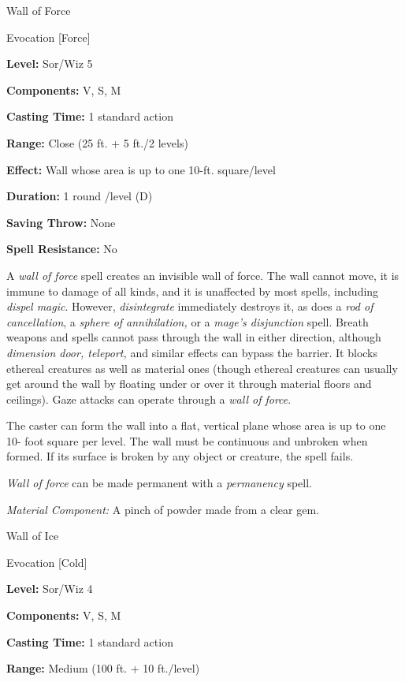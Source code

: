 \documentclass{article}
\begin{document}
\vspace{12pt}
Wall of Force

Evocation [Force]

\textbf{Level:} Sor/Wiz 5

\textbf{Components:} V, S, M

\textbf{Casting Time:} 1 standard action

\textbf{Range:} Close (25 ft. + 5 ft./2 levels)

\textbf{Effect: }Wall whose area is up to one 10-ft. square/level

\textbf{Duration:} 1 round /level (D)

\textbf{Saving Throw:} None

\textbf{Spell Resistance:} No

A \textit{wall of force }spell creates an invisible wall of force. The wall cannot 
move, it is immune to damage of all kinds, and it is unaffected by most spells, 
including \textit{dispel magic}. However, \textit{disintegrate }immediately destroys 
it, as does a \textit{rod of cancellation}, a \textit{sphere of annihilation, }or 
a \textit{mage's disjunction }spell. Breath weapons and spells cannot pass through 
the wall in either direction, although \textit{dimension door, teleport, }and similar 
effects can bypass the barrier. It blocks ethereal creatures as well as material 
ones (though ethereal creatures can usually get around the wall by floating under 
or over it through material floors and ceilings). Gaze attacks can operate through 
a \textit{wall of force}.

The caster can form the wall into a flat, vertical plane whose area is up to one 
10- foot square per level. The wall must be continuous and unbroken when formed. 
If its surface is broken by any object or creature, the spell fails.

\textit{Wall of force }can be made permanent with a \textit{permanency }spell.

\textit{Material Component: }A pinch of powder made from a clear gem.

\vspace{12pt}
Wall of Ice

Evocation [Cold]

\textbf{Level:} Sor/Wiz 4

\textbf{Components:} V, S, M

\textbf{Casting Time:} 1 standard action

\textbf{Range: }Medium (100 ft. + 10 ft./level)
\end{document}
